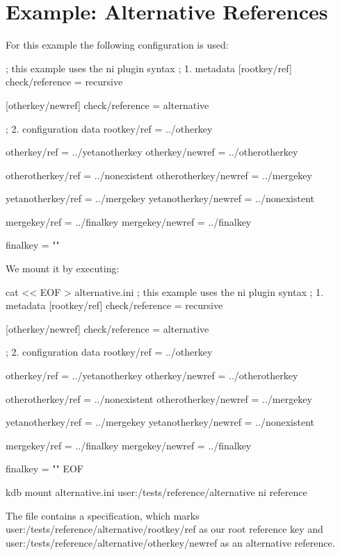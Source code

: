 \hypertarget{autotoc_md554_src_plugins_reference_examples_alternative_README_md}{}\section{Example\+: Alternative References}\label{autotoc_md554_src_plugins_reference_examples_alternative_README_md}
For this example the following configuration is used\+:


\begin{DoxyCode}
; this example uses the ni plugin syntax
; 1. metadata
[rootkey/ref]
check/reference = recursive

[otherkey/newref]
check/reference = alternative

; 2. configuration data
rootkey/ref = ../otherkey

otherkey/ref = ../yetanotherkey
otherkey/newref = ../otherotherkey

otherotherkey/ref = ../nonexistent
otherotherkey/newref = ../mergekey

yetanotherkey/ref = ../mergekey
yetanotherkey/newref = ../nonexistent

mergekey/ref = ../finalkey
mergekey/newref = ../finalkey

finalkey = ""
\end{DoxyCode}


We mount it by executing\+:


\begin{DoxyCode}
cat << EOF > alternative.ini
; this example uses the ni plugin syntax
; 1. metadata
[rootkey/ref]
check/reference = recursive

[otherkey/newref]
check/reference = alternative

; 2. configuration data
rootkey/ref = ../otherkey

otherkey/ref = ../yetanotherkey
otherkey/newref = ../otherotherkey

otherotherkey/ref = ../nonexistent
otherotherkey/newref = ../mergekey

yetanotherkey/ref = ../mergekey
yetanotherkey/newref = ../nonexistent

mergekey/ref = ../finalkey
mergekey/newref = ../finalkey

finalkey = ""
EOF

kdb mount alternative.ini user:/tests/reference/alternative ni reference
\end{DoxyCode}


The file contains a specification, which marks {\ttfamily user\+:/tests/reference/alternative/rootkey/ref} as our root reference key and {\ttfamily user\+:/tests/reference/alternative/otherkey/newref} as an alternative reference.

